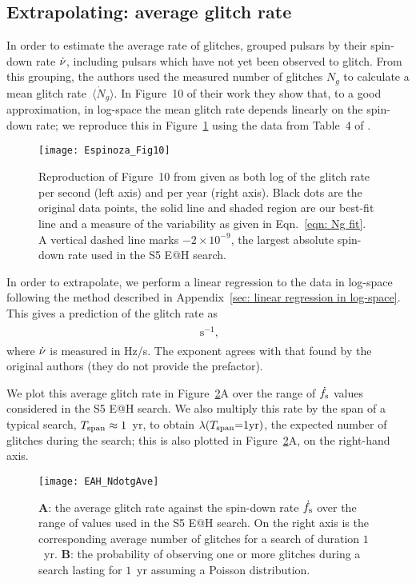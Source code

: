 \documentclass[../full_thesis/full_thesis.tex]{subfiles}
\newcommand{\thisdir}{../glitches_in_CGW}
\begin{document}
\subsection{Extrapolating: average glitch rate}
\label{sec: average glitch frequency}
In order to estimate the average rate of glitches, \citet{Espinoza2011}
grouped pulsars by their spin-down rate $\dot{\nu}$, including pulsars
which have not yet been observed to glitch. From this grouping, the authors
used the measured number of glitches $N_{g}$ to calculate a mean
glitch rate~$\langle \dot{N}_{g}\rangle$. In Figure~10 of their work they
show that, to a good approximation, in log-space the mean glitch rate depends linearly on the spin-down rate;
we reproduce this in Figure~\ref{fig: Espinoza 10} using the data from Table~4
of \citet{Espinoza2011}.
\begin{figure}[htb]
\centering
\texttt{[image: Espinoza\_Fig10]}
\caption{Reproduction of Figure~10 from \citet{Espinoza2011} given as both log of
the glitch rate per second (left axis) and per year (right axis). Black
dots are the original data points, the solid line and shaded region are
our best-fit line and a measure of the variability as given in Eqn.~\eqref{eqn:
Ng fit}. A vertical dashed line marks $-2\times10^{-9}$, the largest absolute
spin-down rate used in the S5 E@H search.}
\label{fig: Espinoza 10}
\end{figure}

In order to extrapolate, we perform a linear regression to the data in
log-space following the method described in Appendix~\ref{sec: linear
regression in log-space}.  This gives a prediction of the glitch rate as
\begin{align}
\begin{split}

\textrm{ s}^{-1},
\end{split}
\label{eqn: Ng fit}
\end{align}
where $\dot{\nu}$ is measured in Hz/s.  The exponent agrees with that found by
the original authors (they do not provide the prefactor).

We plot this average glitch rate in Figure~\ref{fig: EAH_NdotgAve}A over the
range of $\dot{f}_{\textrm{s}}$ values considered in the S5 E@H search. We also multiply this
rate by the span of a typical search, $T_{\mathrm{span}}\approx1$~yr, to obtain
$\lambda(T_{\mathrm{span}}{=}1\mathrm{yr})$, the expected number of glitches during the search; this is
also plotted in Figure~\ref{fig: EAH_NdotgAve}A, on the right-hand axis.

\begin{figure}[htb]
\centering
\texttt{[image: EAH\_NdotgAve]}
\caption{\textbf{A}: the average glitch rate against the spin-down rate
$\dot{f}_{\textrm{s}}$ over the range of values used in the S5 E@H search. On the right axis is
the corresponding average number of glitches for a search of duration $1$~yr.
\textbf{B}: the probability of observing one or
more glitches during a search lasting for $1$~yr assuming a Poisson distribution.}
\label{fig: EAH_NdotgAve}
\end{figure}
\end{document}
